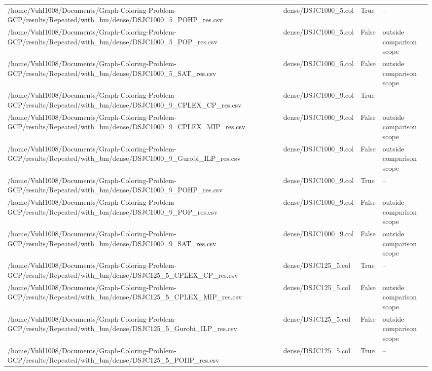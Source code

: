 \begin{table}[htbp]
\begin{tabular}{llll}
/home/Vuhl1008/Documents/Graph-Coloring-Problem-GCP/results/Repeated/with\_bm/dense/DSJC1000\_5\_POHP\_res.csv & dense/DSJC1000\_5.col & True & -- \\
/home/Vuhl1008/Documents/Graph-Coloring-Problem-GCP/results/Repeated/with\_bm/dense/DSJC1000\_5\_POP\_res.csv & dense/DSJC1000\_5.col & False & outside comparison scope \\
/home/Vuhl1008/Documents/Graph-Coloring-Problem-GCP/results/Repeated/with\_bm/dense/DSJC1000\_5\_SAT\_res.csv & dense/DSJC1000\_5.col & False & outside comparison scope \\
/home/Vuhl1008/Documents/Graph-Coloring-Problem-GCP/results/Repeated/with\_bm/dense/DSJC1000\_9\_CPLEX\_CP\_res.csv & dense/DSJC1000\_9.col & True & -- \\
/home/Vuhl1008/Documents/Graph-Coloring-Problem-GCP/results/Repeated/with\_bm/dense/DSJC1000\_9\_CPLEX\_MIP\_res.csv & dense/DSJC1000\_9.col & False & outside comparison scope \\
/home/Vuhl1008/Documents/Graph-Coloring-Problem-GCP/results/Repeated/with\_bm/dense/DSJC1000\_9\_Gurobi\_ILP\_res.csv & dense/DSJC1000\_9.col & False & outside comparison scope \\
/home/Vuhl1008/Documents/Graph-Coloring-Problem-GCP/results/Repeated/with\_bm/dense/DSJC1000\_9\_POHP\_res.csv & dense/DSJC1000\_9.col & True & -- \\
/home/Vuhl1008/Documents/Graph-Coloring-Problem-GCP/results/Repeated/with\_bm/dense/DSJC1000\_9\_POP\_res.csv & dense/DSJC1000\_9.col & False & outside comparison scope \\
/home/Vuhl1008/Documents/Graph-Coloring-Problem-GCP/results/Repeated/with\_bm/dense/DSJC1000\_9\_SAT\_res.csv & dense/DSJC1000\_9.col & False & outside comparison scope \\
/home/Vuhl1008/Documents/Graph-Coloring-Problem-GCP/results/Repeated/with\_bm/dense/DSJC125\_5\_CPLEX\_CP\_res.csv & dense/DSJC125\_5.col & True & -- \\
/home/Vuhl1008/Documents/Graph-Coloring-Problem-GCP/results/Repeated/with\_bm/dense/DSJC125\_5\_CPLEX\_MIP\_res.csv & dense/DSJC125\_5.col & False & outside comparison scope \\
/home/Vuhl1008/Documents/Graph-Coloring-Problem-GCP/results/Repeated/with\_bm/dense/DSJC125\_5\_Gurobi\_ILP\_res.csv & dense/DSJC125\_5.col & False & outside comparison scope \\
/home/Vuhl1008/Documents/Graph-Coloring-Problem-GCP/results/Repeated/with\_bm/dense/DSJC125\_5\_POHP\_res.csv & dense/DSJC125\_5.col & True & -- \\

\end{tabular}
\end{table}
